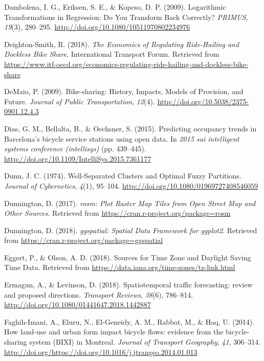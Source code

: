 \documentclass[12pt,oneside]{reedthesis}
\begin{document}
\hypertarget{ref-dambolena2009}{}
Dambolena, I. G., Eriksen, S. E., \& Kopcso, D. P. (2009). Logarithmic
Transformations in Regression: Do You Transform Back Correctly?
\emph{PRIMUS}, \emph{19}(3), 280--295.
\url{http://doi.org/10.1080/10511970802234976}

\hypertarget{ref-itf2018}{}
Deighton-Smith, R. (2018). \emph{The Economics of Regulating
Ride-Hailing and Dockless Bike Share}. International Transport Forum.
Retrieved from
\url{https://www.itf-oecd.org/economics-regulating-ride-hailing-and-dockless-bike-share}

\hypertarget{ref-demaio2009}{}
DeMaio, P. (2009). Bike-sharing: History, Impacts, Models of Provision,
and Future. \emph{Journal of Public Transportation}, \emph{12}(4).
\url{http://doi.org/10.5038/2375-0901.12.4.3}

\hypertarget{ref-dias2015}{}
Dias, G. M., Bellalta, B., \& Oechsner, S. (2015). Predicting occupancy
trends in Barcelona's bicycle service stations using open data. In
\emph{2015 sai intelligent systems conference (intellisys)} (pp.
439--445). \url{http://doi.org/10.1109/IntelliSys.2015.7361177}

\hypertarget{ref-dunn1974}{}
Dunn, J. C. (1974). Well-Separated Clusters and Optimal Fuzzy
Partitions. \emph{Journal of Cybernetics}, \emph{4}(1), 95--104.
\url{http://doi.org/10.1080/01969727408546059}

\hypertarget{ref-rosm}{}
Dunnington, D. (2017). \emph{rosm: Plot Raster Map Tiles from Open
Street Map and Other Sources}. Retrieved from
\url{https://cran.r-project.org/package=rosm}

\hypertarget{ref-ggspatial}{}
Dunnington, D. (2018). \emph{ggspatial: Spatial Data Framework for
ggplot2}. Retrieved from
\url{https://cran.r-project.org/package=ggspatial}

\hypertarget{ref-tz}{}
Eggert, P., \& Olson, A. D. (2018). Sources for Time Zone and Daylight
Saving Time Data. Retrieved from
\url{https://data.iana.org/time-zones/tz-link.html}

\hypertarget{ref-ermagun2018}{}
Ermagun, A., \& Levinson, D. (2018). Spatiotemporal traffic forecasting:
review and proposed directions. \emph{Transport Reviews}, \emph{38}(6),
786--814. \url{http://doi.org/10.1080/01441647.2018.1442887}

\hypertarget{ref-faghih2014}{}
Faghih-Imani, A., Eluru, N., El-Geneidy, A. M., Rabbat, M., \& Haq, U.
(2014). How land-use and urban form impact bicycle flows: evidence from
the bicycle-sharing system (BIXI) in Montreal. \emph{Journal of
Transport Geography}, \emph{41}, 306--314.
\url{http://doi.org/https://doi.org/10.1016/j.jtrangeo.2014.01.013}
\end{document}
